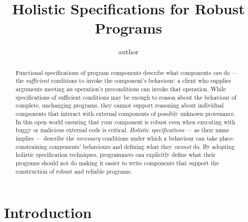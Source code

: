 \documentclass[acmsmall,screen,anonymous,review]{acmart}
\begin{document}
\author{ author}



\title{Holistic Specifications for Robust Programs}


\begin{abstract}
Functional specifications of program components describe what
components \emph{can} do --- the \emph{sufficient} conditions to
invoke the component's behaviour: a client who supplies arguments
meeting an operation's preconditions can invoke that operation. 
While specifications of sufficient conditions may be enough to reason about the behaviour of
complete, unchanging  programs, they cannot support reasoning about
individual components that interact with external components of possibly unknown provenance. 
In this open world ensuring that your component is robust even when executing with buggy or malicious external code is critical.
 \emph{Holistic specifications}
--- as their name implies --- describe the \emph{necessary}
conditions under which a behaviour can take place: constraining
components' behaviours and defining what they \emph{cannot} do.  By
adopting holistic specification techniques,
programmers can explicitly define what their programs should not do
making it easier to write components
that support the construction
of robust and reliable programs.




\end{abstract}


\maketitle

\section{Introduction}

\end{document}
